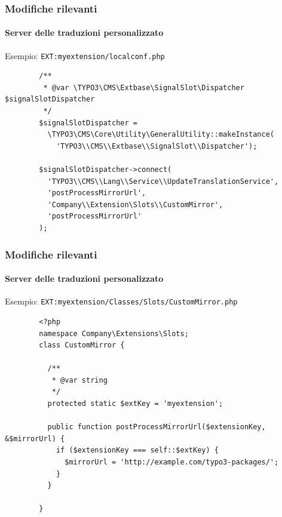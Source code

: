 
\begin{frame}[fragile]
	\frametitle{Modifiche rilevanti}
	\framesubtitle{Server delle traduzioni personalizzato}

	Esempio: \texttt{EXT:myextension/localconf.php}

	\lstset{
		basicstyle=\tiny\ttfamily
	}

	\begin{lstlisting}
		/**
		 * @var \TYPO3\CMS\Extbase\SignalSlot\Dispatcher $signalSlotDispatcher
		 */
		$signalSlotDispatcher =
		  \TYPO3\CMS\Core\Utility\GeneralUtility::makeInstance(
		    'TYPO3\\CMS\\Extbase\\SignalSlot\\Dispatcher');

		$signalSlotDispatcher->connect(
		  'TYPO3\\CMS\\Lang\\Service\\UpdateTranslationService',
		  'postProcessMirrorUrl',
		  'Company\\Extension\Slots\\CustomMirror',
		  'postProcessMirrorUrl'
		);
	\end{lstlisting}

\end{frame}


\begin{frame}[fragile]
	\frametitle{Modifiche rilevanti}
	\framesubtitle{Server delle traduzioni personalizzato}

	Esempio: \texttt{EXT:myextension/Classes/Slots/CustomMirror.php}

	\lstset{
		basicstyle=\tiny\ttfamily
	}

	\begin{lstlisting}
		<?php
		namespace Company\Extensions\Slots;
		class CustomMirror {

		  /**
		   * @var string
		   */
		  protected static $extKey = 'myextension';

		  public function postProcessMirrorUrl($extensionKey, &$mirrorUrl) {
		    if ($extensionKey === self::$extKey) {
		      $mirrorUrl = 'http://example.com/typo3-packages/';
		    }
		  }

		}
	\end{lstlisting}

\end{frame}

